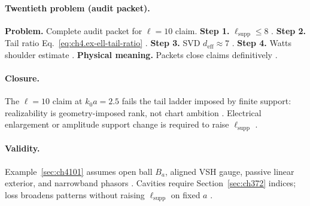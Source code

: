 \paragraph{Twentieth problem (audit packet).}
\textbf{Problem.} Complete audit packet for \(\ell=10\) claim.
\textbf{Step 1.} \(\ell_{\mathrm{supp}}\le8\) \cite{hansen1988,harrington2001,jackson1999,stratton1941,devaney2004}.
\textbf{Step 2.} Tail ratio Eq.~\eqref{eq:ch4.ex-ell-tail-ratio} \cite{harrington2001,stratton1941,hansen1988,devaney2004,jackson1999}.
\textbf{Step 3.} SVD \(d_{\mathrm{eff}}\approx7\) \cite{devaney2004,harrington2001,stratton1941,hansen1988,jackson1999}.
\textbf{Step 4.} Watts shoulder estimate \cite{harrington2001,stratton1941,hansen1988,devaney2004,jackson1999}.
\textbf{Physical meaning.} Packets close claims definitively \cite{stratton1941,harrington2001,hansen1988,devaney2004,jackson1999}.

\paragraph{Closure.}
The \(\ell=10\) claim at \(k_{0}a=2.5\) fails the tail ladder imposed by finite support: realizability is geometry-imposed rank, not chart ambition
\cite{stratton1941,harrington2001,hansen1988,jackson1999,devaney2004}. Electrical enlargement or amplitude support change is required to raise \(\ell_{\mathrm{supp}}\)
\cite{harrington2001,stratton1941}.

\paragraph{Validity.}
Example~\ref{sec:ch4101} assumes open ball \(B_{a}\), aligned VSH gauge, passive linear exterior, and narrowband phasors \cite{stratton1941,hansen1988,harrington2001,jackson1999,devaney2004}.
Cavities require Section~\ref{sec:ch372} indices; loss broadens patterns without raising \(\ell_{\mathrm{supp}}\) on fixed \(a\) \cite{harrington2001,devaney2004}.
